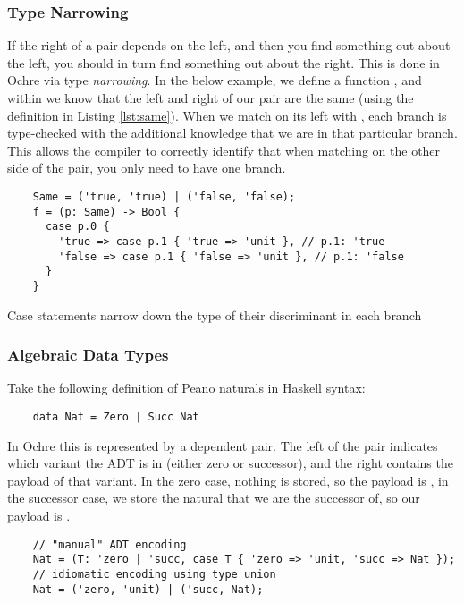 \documentclass[12pt,twoside]{report}
\begin{document}
\subsubsection{Type Narrowing}
If the right of a pair depends on the left, and then you find something out about the left, you should in turn find something out about the right. This is done in Ochre via type \textit{narrowing}. In the below example, we define a function , and within  we know that the left and right of our pair  are the same (using the definition in Listing \ref{lst:same}). When we match on its left with , each branch is type-checked with the additional knowledge that we are in that particular branch. This allows the compiler to correctly identify that when matching on the other side of the pair, you only need to have one branch.

\begin{listing}[H]
  \begin{verbatim}
    Same = ('true, 'true) | ('false, 'false);
    f = (p: Same) -> Bool {
      case p.0 {
        'true => case p.1 { 'true => 'unit }, // p.1: 'true
        'false => case p.1 { 'false => 'unit }, // p.1: 'false
      }
    }
  \end{verbatim}
  \caption{Case statements narrow down the type of their discriminant in each branch}
\end{listing}

\subsubsection{Algebraic Data Types}
Take the following definition of Peano naturals in Haskell syntax:

  \begin{verbatim}
    data Nat = Zero | Succ Nat
  \end{verbatim}

In Ochre this is represented by a dependent pair. The left of the pair indicates which variant the ADT is in (either zero or successor), and the right contains the payload of that variant. In the zero case, nothing is stored, so the payload is , in the successor case, we store the natural that we are the successor of, so our payload is .

  \begin{verbatim}
    // "manual" ADT encoding
    Nat = (T: 'zero | 'succ, case T { 'zero => 'unit, 'succ => Nat });
    // idiomatic encoding using type union
    Nat = ('zero, 'unit) | ('succ, Nat);
  \end{verbatim}
\end{document}
